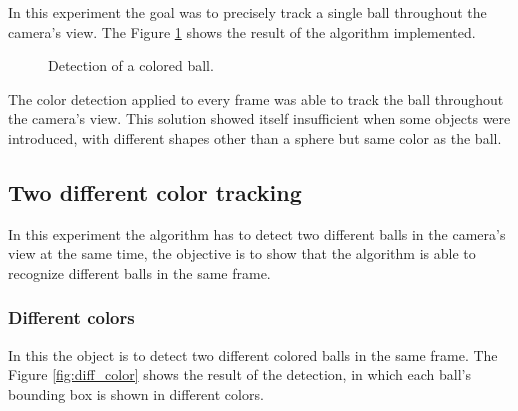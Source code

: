 \documentclass[10pt,twocolumn,letterpaper]{article}
\begin{document}
In this experiment the goal was to precisely track a single ball throughout the camera's view. The Figure \ref{fig:single_color} shows the result of the algorithm implemented.

\begin{figure}[!h]
\centering
\setlength{\fboxsep}{1pt}
\setlength{\fboxrule}{1pt}
\caption{Detection of a colored ball.}\label{fig:single_color}
\end{figure}

The color detection applied to every frame was able to track the ball throughout the camera's view. This solution showed itself insufficient when some objects were introduced, with different shapes other than a sphere but same color as the ball.

\subsection{Two different color tracking}

In this experiment the algorithm has to detect two different balls in the camera's view at the same time, the objective is to show that the algorithm is able to recognize different balls in the same frame. 

\subsubsection{Different colors}

In this the object is to detect two different colored balls in the same frame. The Figure \ref{fig:diff_color} shows the result of the detection, in which each ball's  bounding box is shown in different colors.
\end{document}

